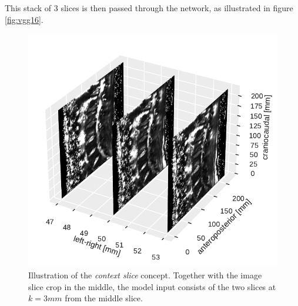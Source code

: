 This stack of 3 slices is then passed through the network, as illustrated in figure \ref{fig:vgg16}.

\begin{figure}
\centering
    \includegraphics[width=.49\textwidth]{images/Context_slices.pdf}
    \caption{Illustration of the \textit{context slice} concept. Together with the image slice crop in the middle, the model input consists of the two slices at $k=3mm$ from the middle slice.}
\end{figure}

